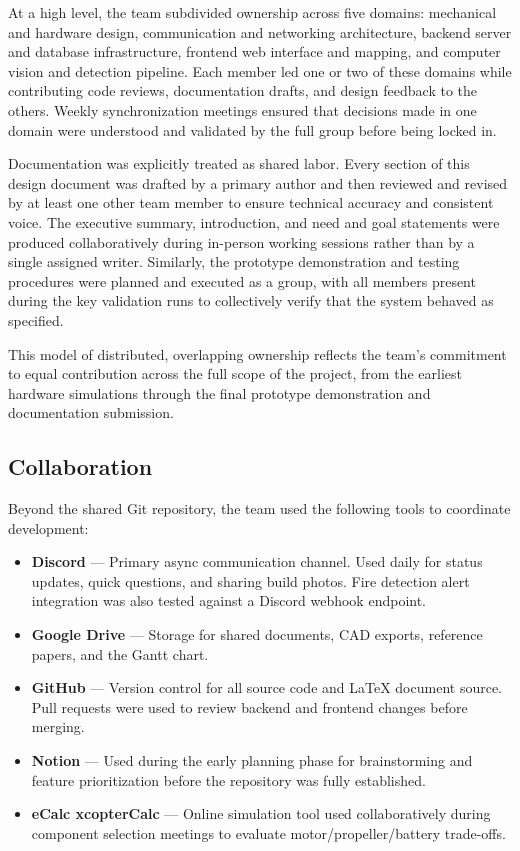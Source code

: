 \documentclass[journal, onecolumn]{IEEEtran}
\begin{document}
At a high level, the team subdivided ownership across five domains: mechanical and hardware design, communication and networking architecture, backend server and database infrastructure, frontend web interface and mapping, and computer vision and detection pipeline. Each member led one or two of these domains while contributing code reviews, documentation drafts, and design feedback to the others. Weekly synchronization meetings ensured that decisions made in one domain were understood and validated by the full group before being locked in.

Documentation was explicitly treated as shared labor. Every section of this design document was drafted by a primary author and then reviewed and revised by at least one other team member to ensure technical accuracy and consistent voice. The executive summary, introduction, and need and goal statements were produced collaboratively during in-person working sessions rather than by a single assigned writer. Similarly, the prototype demonstration and testing procedures were planned and executed as a group, with all members present during the key validation runs to collectively verify that the system behaved as specified.

This model of distributed, overlapping ownership reflects the team's commitment to equal contribution across the full scope of the project, from the earliest hardware simulations through the final prototype demonstration and documentation submission.

\subsection{Collaboration}

Beyond the shared Git repository, the team used the following tools to coordinate development:

\begin{itemize}
    \item \textbf{Discord} — Primary async communication channel. Used daily for status updates, quick questions, and sharing build photos. Fire detection alert integration was also tested against a Discord webhook endpoint.
    \item \textbf{Google Drive} — Storage for shared documents, CAD exports, reference papers, and the Gantt chart.
    \item \textbf{GitHub} — Version control for all source code and \LaTeX{} document source. Pull requests were used to review backend and frontend changes before merging.
    \item \textbf{Notion} — Used during the early planning phase for brainstorming and feature prioritization before the repository was fully established.
    \item \textbf{eCalc xcopterCalc} — Online simulation tool used collaboratively during component selection meetings to evaluate motor/propeller/battery trade-offs.
\end{itemize}
\end{document}
